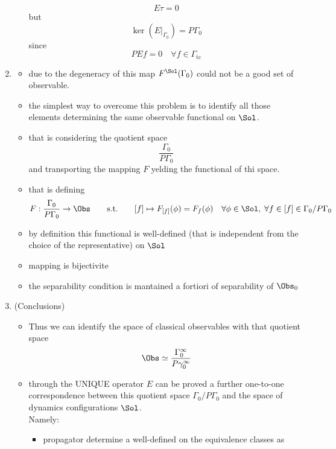 \documentclass[a4paper,11pt]{scrartcl}
\begin{document}
\begin{enumerate}
\begin{itemize}
                $$ E\tau = 0$$
                but
                $$ \ker(E\vert_{\Gamma_0}) = P\Gamma_0 $$
                since
                $$ PE f = 0 \quad \forall f \in \Gamma_\textrm{tc} $$
            \end{itemize}
        \item
            \begin{itemize}
                \item due to the degeneracy of this map $F^\Sol(\Gamma_0)$ could not be a good set of observable.
                \item the simplest way to overcome this problem is to identify all those elements determining the same observable functional on $\Sol$.
                \item that is considering the quotient space $$\frac{\Gamma_0}{P \Gamma_0}$$
                and transporting the mapping $F$ yelding the functional of thi space.
                \item that is defining
                $$F: \frac{\Gamma_0}{P \Gamma_0} \rightarrow \Obs \qquad 
                \textrm{s.t.} \qquad
                [f] \mapsto F_{[f]}(\phi) = F_f(\phi) \quad 
                \forall \phi \in \Sol , \; \forall f \in [f] \in \Gamma_0 / P \Gamma_0 $$
                \item by definition this functional is well-defined (that is independent from the choice of the representative) on $\Sol$
                \item mapping is bijectivite
                \item the separability condition is mantained a fortiori of separability of $\Obs_0$
            \end{itemize}
        \item (Conclusions)
            \begin{itemize}
                \item Thus we can identify the space of classical observables with that quotient space
                $$ \Obs \simeq \frac{\Gamma_0^\infty}{P \gamma_0^\infty} $$
                \item through the UNIQUE operator $E$ can be proved a further one-to-one correspondence between this quotient space $\Gamma_0 / P \Gamma_0$ and the space of dynamics configurations $\Sol$.\\
                Namely:
                \begin{itemize}
                    \item propagator determine a  well-defined on the equivalence classes as  

\end{itemize}
\end{itemize}
\end{enumerate}
\end{document}
